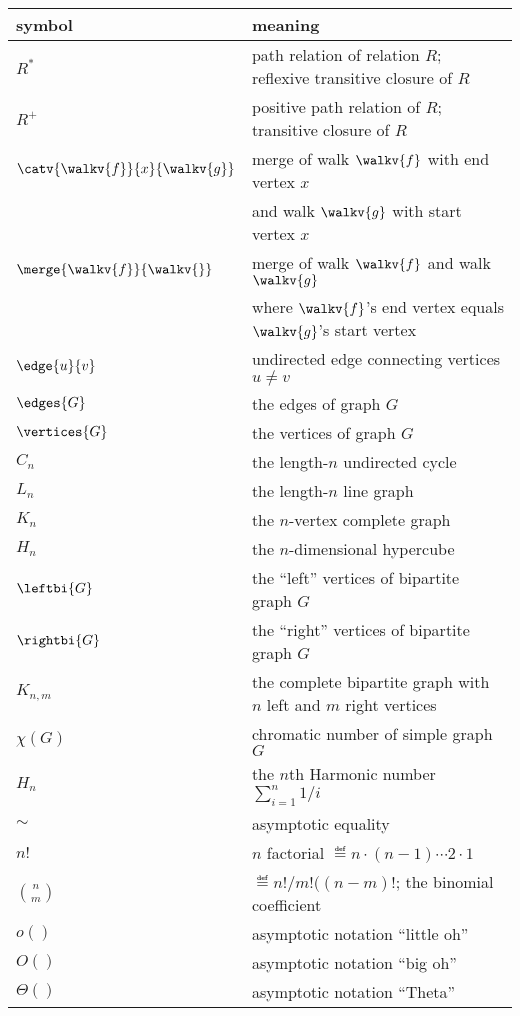 \begin{center}
\begin{tabular}{ll}
symbol         &  meaning\\
\hline
$R^*$          & path relation of relation $R$; reflexive transitive closure of $R$\\
$R^+$          & positive path relation of $R$; transitive closure of $R$\\
$\catv{\walkv{f}}{x}{\walkv{g}}$   & merge of walk $\walkv{f}$ with end vertex $x$\\
                                   & and walk $\walkv{g}$ with start vertex $x$\\
$\merge{\walkv{f}}{\walkv{}}$      & merge of walk $\walkv{f}$ and walk $\walkv{g}$\\
                                   & where $\walkv{f}$'s end vertex equals $\walkv{g}$'s start vertex\\
$\edge{u}{v}$  & undirected edge connecting vertices $u \neq v$\\
$\edges{G}$    & the edges of graph $G$\\
$\vertices{G}$ & the vertices of graph $G$\\
$C_n$          & the length-$n$ undirected cycle\\
$L_n$          & the length-$n$ line graph\\
$K_n$          & the $n$-vertex complete graph\\
$H_n$          & the $n$-dimensional hypercube\\
$\leftbi{G}$   & the ``left'' vertices of bipartite graph $G$\\
$\rightbi{G}$  & the ``right'' vertices of bipartite graph $G$\\
$K_{n,m}$       & the complete bipartite graph with $n$ left and $m$ right vertices\\
$\chi(G)$      & chromatic number of simple graph $G$\\
$H_n$          & the $n$th Harmonic number $\sum_{i=1}^n 1/i$\\
$\sim$         & asymptotic equality\\
$n!$           & $n$ factorial $\eqdef n \cdot (n-1) \cdots 2 \cdot 1$\\
$\binom{n}{m}$ & $\eqdef n!/m!((n-m)!$; the binomial coefficient\\
$o()$          & asymptotic notation ``little oh''\\
$O()$          & asymptotic notation ``big oh''\\
$\Theta()$     & asymptotic notation ``Theta''\\

\end{tabular}
\end{center}
